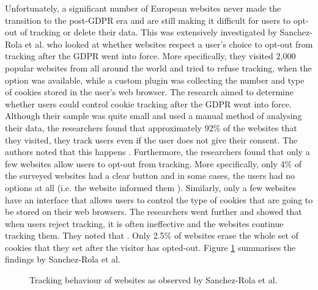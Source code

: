 \documentclass[../main.tex]{subfiles}
\begin{document}
Unfortunately, a significant number of European websites never made the transition to the post-GDPR era and are still making it difficult for users to opt-out of tracking or delete their data. This was extensively investigated by Sanchez-Rola et al. \cite{sanchez2019can} who looked at whether websites respect a user’s choice to opt-out from tracking after the GDPR went into force. More specifically, they visited 2,000 popular websites from all around the world and tried to refuse tracking, when the option was available, while a custom plugin was collecting the number and type of cookies stored in the user’s web browser. The research aimed to determine whether users could control cookie tracking after the GDPR went into force. Although their sample was quite small and used a manual method of analysing their data, the researchers found that approximately 92\% of the websites that they visited, they track users even if the user does not give their consent. The authors noted that this happens . Furthermore, the researchers found that only a few websites allow users to opt-out from tracking. More specifically, only 4\% of the surveyed websites had a clear  button and in some cases, the users had no options at all (i.e. the website informed them ). Similarly, only a few websites have an  interface that allows users to control the type of cookies that are going to be stored on their web browsers. The researchers went further and showed that when users reject tracking, it is often ineffective and the websites continue tracking them. They noted that . Only 2.5\% of websites erase the whole set of cookies that they set after the visitor has opted-out. Figure \ref{fig:sanches} summarises the findings by Sanchez-Rola et al. 

\begin{figure}[ht]
    \centering
    \caption{Tracking behaviour of websites as observed by Sanchez-Rola et al.}
    \label{fig:sanches}
\end{figure}
\end{document}
